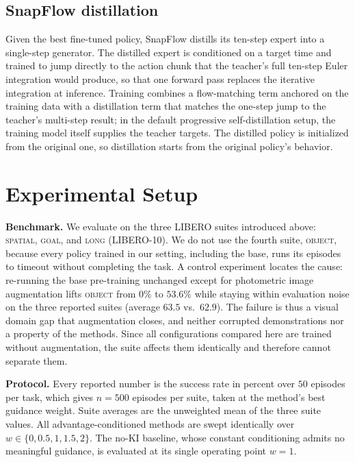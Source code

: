 \documentclass[conference]{IEEEtran}
\begin{document}
\subsection{SnapFlow distillation}
Given the best fine-tuned policy, SnapFlow distills its ten-step expert into a single-step
generator. The distilled expert is conditioned on a target time and trained to jump
directly to the action chunk that the teacher's full ten-step Euler integration would
produce, so that one forward pass replaces the iterative integration at inference.
Training combines a flow-matching term anchored on the training data with a distillation
term that matches the one-step jump to the teacher's multi-step result; in the default
progressive self-distillation setup, the training model itself supplies the teacher
targets. The distilled policy is initialized from the original one, so distillation starts
from the original policy's behavior.

\section{Experimental Setup}\label{sec:setup}
\textbf{Benchmark.} We evaluate on the three LIBERO suites introduced above:
\textsc{spatial}, \textsc{goal}, and \textsc{long} (LIBERO-10). We do not use the fourth
suite, \textsc{object}, because every policy trained in our setting, including the base,
runs its episodes to timeout without completing the task. A control experiment locates the
cause: re-running the base pre-training unchanged except for photometric image augmentation
lifts \textsc{object} from $0\%$ to $53.6\%$ while staying within evaluation noise on the
three reported suites (average $63.5$ vs.\ $62.9$). The failure is thus a visual domain gap
that augmentation closes, and neither corrupted demonstrations nor a property of the
methods. Since all configurations compared here are trained without augmentation, the suite
affects them identically and therefore cannot separate them.

\textbf{Protocol.} Every reported number is the success rate in percent over $50$ episodes
per task, which gives $n{=}500$ episodes per suite, taken at the method's best guidance
weight. Suite averages are the unweighted mean of the three suite values. All
advantage-conditioned methods are swept identically over $w\in\{0,0.5,1,1.5,2\}$. The
no-KI baseline, whose constant conditioning admits no meaningful guidance, is evaluated at
its single operating point $w{=}1$.
\end{document}
